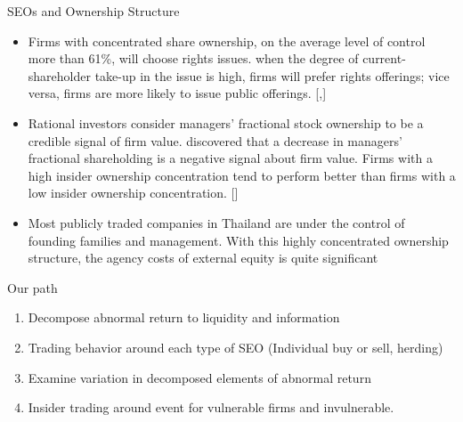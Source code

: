 \documentclass{beamer}
\begin{document}
	\begin{frame}{SEOs and Ownership Structure}
		\begin{itemize}\scriptsize
			
			\item  Firms with concentrated share ownership, on the
			average level of control more than 61\%, will choose rights issues. when the degree of current-shareholder take-up in the issue is high,
			firms will prefer rights offerings; vice versa, firms are more likely to issue public
			offerings. [\cite{hansen1982direct},\cite{eckbo1992adverse}]
			\item Rational investors consider managers’ fractional
			stock ownership to be a credible signal of firm value. 
			\cite{leland1977informational}  discovered
			that a decrease in managers’ fractional shareholding is a negative signal about firm
			value. Firms with a high insider ownership concentration
			tend to perform better than firms with a low insider ownership concentration. [\cite{limpaphayom2004ownership}]
			\item Most publicly traded companies in Thailand are under the control of founding families
			and management. With this highly concentrated ownership structure, the agency costs
			of external equity is quite significant
		\end{itemize}
	\end{frame}
	

	\begin{frame}{Our path}
		\begin{enumerate}
			\item Decompose abnormal return to liquidity and information
			\item Trading behavior around each type of SEO (Individual buy or sell, herding)
			\item Examine variation in decomposed elements of abnormal return
			\item Insider trading around event for vulnerable firms and invulnerable.
		\end{enumerate}
	\end{frame}
	
\end{document}
